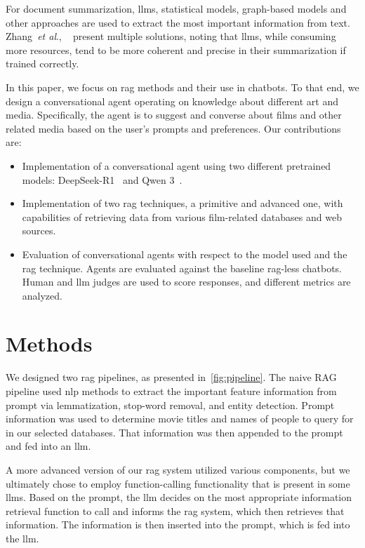 \documentclass[fleqn,moreauthors,10pt]{ds_report}
\newcommand{\etal}{\textit{et al}., }
\begin{document}
For document summarization, \acp{llm}, statistical models, graph-based models and other approaches are used to extract the most important information from text. Zhang~\etal~\cite{summarization} present multiple solutions, noting that \acp{llm}, while consuming more resources, tend to be more coherent and precise in their summarization if trained correctly.

In this paper, we focus on \ac{rag} methods and their use in chatbots. To that end, we design a conversational agent operating on knowledge about different art and media. Specifically, the agent is to suggest and converse about films and other related media based on the user’s prompts and preferences. Our contributions are:

\begin{itemize}
	\item Implementation of a conversational agent using two different pretrained models: DeepSeek-R1~\cite{deepseek3} and Qwen 3~\cite{qwen3}.
	\item Implementation of two \ac{rag} techniques, a primitive and advanced one, with capabilities of retrieving data from various film-related databases and web sources.
	\item Evaluation of conversational agents with respect to the model used and the \ac{rag} technique. Agents are evaluated against the baseline \ac{rag}-less chatbots. Human and \ac{llm} judges are used to score responses, and different metrics are analyzed.
\end{itemize}


\section*{Methods}

We designed two \ac{rag} pipelines, as presented in~\cref{fig:pipeline}. The naive RAG pipeline used \ac{nlp} methods to extract the important feature information from prompt via lemmatization, stop-word removal, and entity detection. Prompt information was used to determine movie titles and names of people to query for in our selected databases. That information was then appended to the prompt and fed into an \ac{llm}.

A more advanced version of our \ac{rag} system utilized various components, but we ultimately chose to employ function-calling functionality that is present in some \acp{llm}. Based on the prompt, the \ac{llm} decides on the most appropriate information retrieval function to call and informs the \ac{rag} system, which then retrieves that information. The information is then inserted into the prompt, which is fed into the \ac{llm}.
\end{document}
